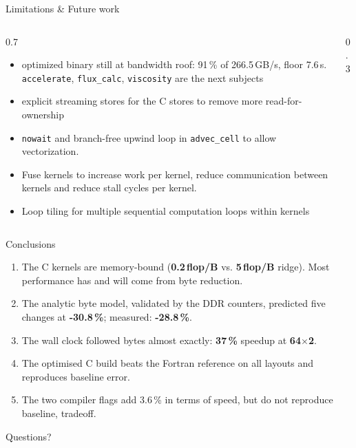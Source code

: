 \documentclass[aspectratio=169,10pt]{beamer}
\newcommand{\kernel}[1]{\texttt{#1}}
\newcommand{\GBs}{\,GB/s}
\begin{document}
\begin{frame}{Limitations \& Future work}
    \begin{columns}
        \begin{column}{0.7\textwidth}
          \begin{itemize}
            \item optimized binary still at bandwidth roof: 91\,\% of 266.5\GBs, floor 7.6\,s. \kernel{accelerate}, \kernel{flux\_calc}, \kernel{viscosity} are the next subjects
            \item explicit streaming stores for the C stores to remove more read-for-ownership
            \item \texttt{nowait} and branch-free upwind loop in \kernel{advec\_cell} to allow vectorization.
            \item Fuse kernels to increase work per kernel, reduce communication between kernels and reduce stall cycles per kernel.
            \item Loop tiling for multiple sequential computation loops within kernels
          \end{itemize}
        \end{column}
        \begin{column}{0.3\textwidth}
        \end{column}
    \end{columns}
\end{frame}

\begin{frame}{Conclusions}
  \begin{enumerate}
    \item The C kernels are memory-bound (\textbf{0.2\,flop/B} vs. \textbf{5\,flop/B} ridge). Most performance has and will come from byte reduction.
    \item The analytic byte model, validated by the DDR counters, predicted five changes at \textbf{-30.8\,\%}; measured: \textbf{-28.8\,\%}.
    \item The wall clock followed bytes almost exactly: \textbf{37\,\%} speedup at \textbf{64$\times$2}. 
    \item The optimised C build beats the Fortran reference on all layouts and reproduces baseline error.
    \item The two compiler flags add 3.6\,\% in terms of speed, but do not reproduce baseline, tradeoff.
  \end{enumerate}
  \vspace{0.8cm}
  \begin{center}
    \Large\color{rugred} Questions?
  \end{center}
\end{frame}
\end{document}

